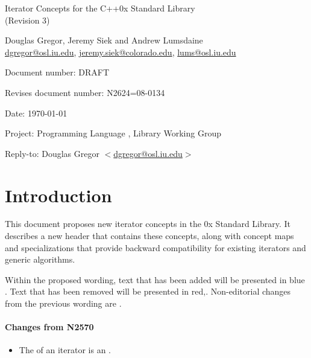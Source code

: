 \documentclass[american,twoside]{book}
\begin{document}
\raggedbottom

\begin{titlepage}
\begin{center}
\huge
Iterator Concepts for the C++0x Standard Library\\
(Revision 3)
\vspace{0.5in}

\normalsize
Douglas Gregor, Jeremy Siek and Andrew Lumsdaine \\
\href{mailto:dgregor@osl.iu.edu}{dgregor@osl.iu.edu}, \href{mailto:jeremy.siek@colorado.edu}{jeremy.siek@colorado.edu}, \href{mailto:lums@osl.iu.edu}{lums@osl.iu.edu}
\end{center}

\vspace{1in}
\par\noindent Document number: DRAFT \vspace{-6pt}
\par\noindent Revises document number: N2624=08-0134 \vspace{-6pt}
\par\noindent Date: \today\vspace{-6pt}
\par\noindent Project: Programming Language \Cpp{}, Library Working Group\vspace{-6pt}
\par\noindent Reply-to: Douglas Gregor $<$\href{mailto:dgregor@osl.iu.edu}{dgregor@osl.iu.edu}$>$\vspace{-6pt}

\section*{Introduction}
This document proposes new iterator concepts in the \Cpp0x Standard
Library. It describes a new header  that
contains these concepts, along with concept maps and
 specializations that provide backward
compatibility for existing iterators and generic algorithms.

Within the proposed wording, text that has been added
\textcolor{addclr}{will be presented in blue} . Text that has been removed will be
presented \textcolor{remclr}{in red},. Non-editorial
changes from the previous wording are . 


\paragraph*{Changes from N2570}
\begin{itemize}
\item The  of an iterator is an .
\end{itemize}

\end{titlepage}
\end{document}
